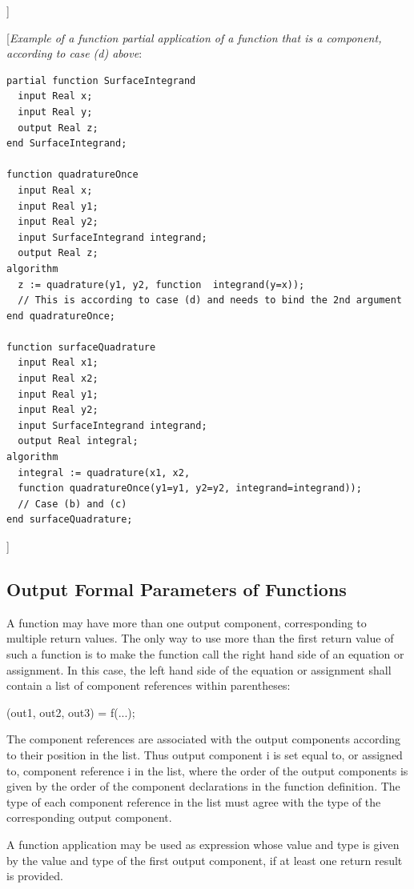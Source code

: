 \documentclass[10pt,a4paper]{report}
\def\doublelabel#1{\label{#1}\hypertarget{#1}{}}
\begin{document}
{]}

{[}\emph{Example of a function partial application of a function that is
a component, according to case (d) above}:

\begin{lstlisting}[language=modelica]
partial function SurfaceIntegrand
  input Real x;
  input Real y;
  output Real z;
end SurfaceIntegrand;

function quadratureOnce
  input Real x;
  input Real y1;
  input Real y2;
  input SurfaceIntegrand integrand;
  output Real z;
algorithm
  z := quadrature(y1, y2, function  integrand(y=x));
  // This is according to case (d) and needs to bind the 2nd argument
end quadratureOnce;

function surfaceQuadrature
  input Real x1;
  input Real x2;
  input Real y1;
  input Real y2;
  input SurfaceIntegrand integrand;
  output Real integral;
algorithm
  integral := quadrature(x1, x2,
  function quadratureOnce(y1=y1, y2=y2, integrand=integrand));
  // Case (b) and (c)
end surfaceQuadrature;
\end{lstlisting}
{]}

\subsection{Output Formal Parameters of Functions}\doublelabel{output-formal-parameters-of-functions}

A function may have more than one output component, corresponding to
multiple return values. The only way to use more than the first return
value of such a function is to make the function call the right hand
side of an equation or assignment. In this case, the left hand side of
the equation or assignment shall contain a list of component references
within parentheses:

(out1, out2, out3) = f(...);

The component references are associated with the output components
according to their position in the list. Thus output component i is set
equal to, or assigned to, component reference i in the list, where the
order of the output components is given by the order of the component
declarations in the function definition. The type of each component
reference in the list must agree with the type of the corresponding
output component.

A function application may be used as expression whose value and type is
given by the value and type of the first output component, if at least
one return result is provided.
\end{document}
